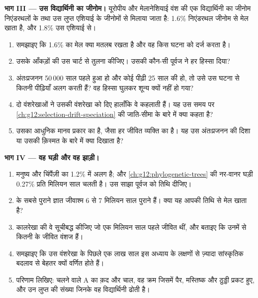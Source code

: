 \begin{problem}
\medskip
\noindent\textbf{भाग III --- उस विद्यार्थिनी का जीनोम।}
यूरोपीय और मेलानेशियाई वंश की एक विद्यार्थिनी का जीनोम निएंडरथलों के तथा उस
लुप्त एशियाई  के जीनोमों से मिलाया जाता है: 1.6\% निएंडरथल जीनोम से
मेल खाता है, और 1.8\% उस एशियाई से।
\begin{enumerate}[resume]
  \item समझाइए कि 1.6\% का मेल क्या मतलब रखता है और वह किस घटना को दर्ज
        करता है।
  \item उसके आँकड़ों की उस चार्ट से तुलना कीजिए। उसकी कौन-सी पूर्वज
         ने हर हिस्सा दिया?
  \item अंतःप्रजनन 50\,000 साल पहले हुआ हो और कोई पीढ़ी 25 साल की हो, तो
        उसे उस घटना से कितनी पीढ़ियाँ अलग करती हैं? वह हिस्सा घुलकर शून्य
        क्यों नहीं हो गया?
  \item दो वंशरेखाओं ने उसकी वंशरेखा को  दिए हालाँकि वे  कहलाती
        हैं। यह उस समय पर
        \cref{ch:g12:selection-drift-speciation} की जाति-सीमा के बारे में
        क्या कहता है?
  \item उसका   आधुनिक मानव प्रकार का है, जैसा हर जीवित व्यक्ति
        का है। यह उस अंतःप्रजनन की दिशा या उसकी क़िस्मत के बारे में क्या
        दिखाता है?
\end{enumerate}

\medskip
\noindent\textbf{भाग IV --- वह घड़ी और वह झाड़ी।}
\begin{enumerate}[resume]
  \item मनुष्य और चिंपैंज़ी का  1.2\% में अलग है; और
        \cref{ch:g12:phylogenetic-trees} की नर-वानर घड़ी 0.27\% प्रति
        मिलियन साल चलती है। उस साझा पूर्वज को तिथि दीजिए।
  \item {} के सबसे पुराने ज्ञात जीवाश्म 6 से 7 मिलियन साल पुराने
        हैं। क्या यह आपकी तिथि से मेल खाता है?
  \item कालरेखा की वे  सूचीबद्ध कीजिए जो एक मिलियन साल पहले जीवित
        थीं, और बताइए कि उनमें से कितनी के जीवित वंशज हैं।
  \item समझाइए कि उस वंशरेखा के पिछले एक लाख साल इस अध्याय के लक्षणों से
        ज़्यादा सांस्कृतिक बदलाव से बेहतर क्यों वर्णित होते हैं।
  \item परिणाम लिखिए: चलने वाले A का क़द और चाल, वह क्रम जिसमें पैर,
        मस्तिष्क और ठुड्डी प्रकट हुए, और उन लुप्त  की संख्या
        जिनके  वह विद्यार्थिनी ढोती है।
\end{enumerate}
\end{problem}
